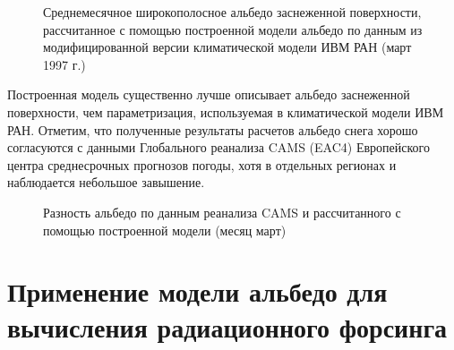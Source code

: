 \documentclass[a4paper, fontsize=14pt]{scrartcl}
\begin{document}
\begin{figure}[h]
    \caption{Среднемесячное широкополосное альбедо заснеженной поверхности, рассчитанное с помощью построенной модели альбедо по данным из модифицированной версии климатической модели ИВМ РАН (март 1997 г.) \sloppy}
\end{figure}

Построенная модель существенно лучше описывает альбедо заснеженной поверхности, чем параметризация, используемая в климатической модели ИВМ РАН. Отметим, что полученные результаты расчетов альбедо снега хорошо согласуются с данными Глобального реанализа CAMS (EAC4) Европейского центра среднесрочных прогнозов погоды, хотя в отдельных регионах и наблюдается небольшое завышение. 

\begin{figure}[H]
    \caption{Разность альбедо по данным реанализа CAMS и рассчитанного с помощью построенной модели (месяц март) \sloppy}
\end{figure}

\newpage
\section{Применение модели альбедо для вычисления радиационного форсинга}
\end{document}
